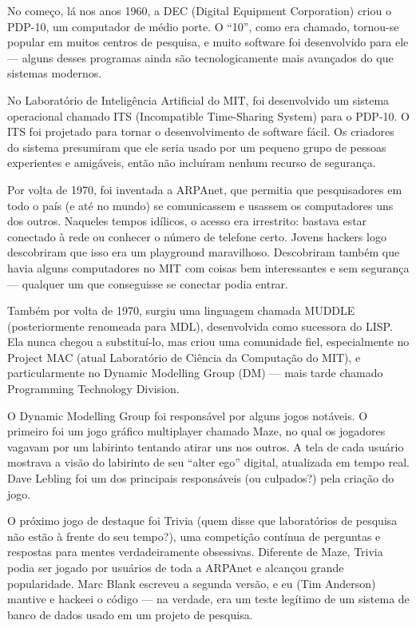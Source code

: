 \documentclass[12pt,a4paper]{article}
\begin{document}
No começo, lá nos anos 1960, a DEC (Digital Equipment Corporation) criou o PDP-10, um computador de médio porte. O “10”, como era chamado, tornou-se popular em muitos centros de pesquisa, e muito software foi desenvolvido para ele — alguns desses programas ainda são tecnologicamente mais avançados do que sistemas modernos.

No Laboratório de Inteligência Artificial do MIT, foi desenvolvido um sistema operacional chamado ITS (Incompatible Time-Sharing System) para o PDP-10. O ITS foi projetado para tornar o desenvolvimento de software fácil. Os criadores do sistema presumiram que ele seria usado por um pequeno grupo de pessoas experientes e amigáveis, então não incluíram nenhum recurso de segurança.

Por volta de 1970, foi inventada a ARPAnet, que permitia que pesquisadores em todo o país (e até no mundo) se comunicassem e usassem os computadores uns dos outros. Naqueles tempos idílicos, o acesso era irrestrito: bastava estar conectado à rede ou conhecer o número de telefone certo. Jovens hackers logo descobriram que isso era um playground maravilhoso. Descobriram também que havia alguns computadores no MIT com coisas bem interessantes e sem segurança — qualquer um que conseguisse se conectar podia entrar.

Também por volta de 1970, surgiu uma linguagem chamada MUDDLE (posteriormente renomeada para MDL), desenvolvida como sucessora do LISP. Ela nunca chegou a substituí-lo, mas criou uma comunidade fiel, especialmente no Project MAC (atual Laboratório de Ciência da Computação do MIT), e particularmente no Dynamic Modelling Group (DM) — mais tarde chamado Programming Technology Division.

O Dynamic Modelling Group foi responsável por alguns jogos notáveis. O primeiro foi um jogo gráfico multiplayer chamado Maze, no qual os jogadores vagavam por um labirinto tentando atirar uns nos outros. A tela de cada usuário mostrava a visão do labirinto de seu “alter ego” digital, atualizada em tempo real. Dave Lebling foi um dos principais responsáveis (ou culpados?) pela criação do jogo.

O próximo jogo de destaque foi Trivia (quem disse que laboratórios de pesquisa não estão à frente do seu tempo?), uma competição contínua de perguntas e respostas para mentes verdadeiramente obsessivas. Diferente de Maze, Trivia podia ser jogado por usuários de toda a ARPAnet e alcançou grande popularidade. Marc Blank escreveu a segunda versão, e eu (Tim Anderson) mantive e hackeei o código — na verdade, era um teste legítimo de um sistema de banco de dados usado em um projeto de pesquisa.
\end{document}
